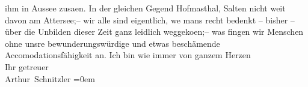 \begin{ledgroupsized}[t]{13cm}
               ihm in Aussee zusa{\geminationm}en. In der gleichen Gegend Hofma{\geminationn}sthal, Salten nicht weit davon am Attersee;– wir
               alle sind eigentlich, we{\geminationn} mans recht bedenkt – bisher –
               über die Unbilden dieser Zeit ganz leidlich weggeko{\geminationm}en;–
               was fingen wir Menschen ohne {\pb}unsre
               bewunderungswürdige und etwas beschämende Accomodationsfähigkeit an.\pend
           \pstart
           Ich bin wie immer von ganzem Herzen{\\[\baselineskip]}Ihr getreuer{\\[\baselineskip]}\spacefill\mbox{Arthur Schnitzler}\pend
           \leftskip=0em{}
         
         \endnumbering{}\end{ledgroupsized}  \newcommand{\dateiname}{L02355}\newcommand{\titel}{Arthur Schnitzler an Georg Brandes, 21. 8. 1920}\newcommand{\editorInnen}{Martin Anton Müller und Gerd-Hermann Susen}
      